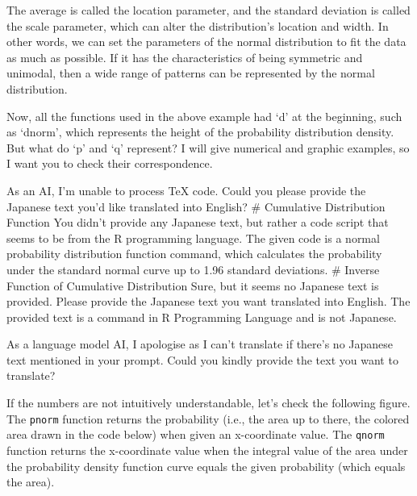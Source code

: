 \documentclass[
  a4paper,
]{book}
\begin{document}
The average is called the location parameter, and the standard deviation
is called the scale parameter, which can alter the distribution's
location and width. In other words, we can set the parameters of the
normal distribution to fit the data as much as possible. If it has the
characteristics of being symmetric and unimodal, then a wide range of
patterns can be represented by the normal distribution.

Now, all the functions used in the above example had `d' at the
beginning, such as `dnorm', which represents the height of the
probability distribution density. But what do `p' and `q' represent? I
will give numerical and graphic examples, so I want you to check their
correspondence.

As an AI, I'm unable to process TeX code. Could you please provide the
Japanese text you'd like translated into English? \# Cumulative
Distribution Function You didn't provide any Japanese text, but rather a
code script that seems to be from the R programming language. The given
code is a normal probability distribution function command, which
calculates the probability under the standard normal curve up to 1.96
standard deviations. \# Inverse Function of Cumulative Distribution
Sure, but it seems no Japanese text is provided. Please provide the
Japanese text you want translated into English. The provided text is a
command in R Programming Language and is not Japanese.

As a language model AI, I apologise as I can't translate if there's no
Japanese text mentioned in your prompt. Could you kindly provide the
text you want to translate?

If the numbers are not intuitively understandable, let's check the
following figure. The \texttt{pnorm} function returns the probability
(i.e., the area up to there, the colored area drawn in the code below)
when given an x-coordinate value. The \texttt{qnorm} function returns
the x-coordinate value when the integral value of the area under the
probability density function curve equals the given probability (which
equals the area).
\end{document}
